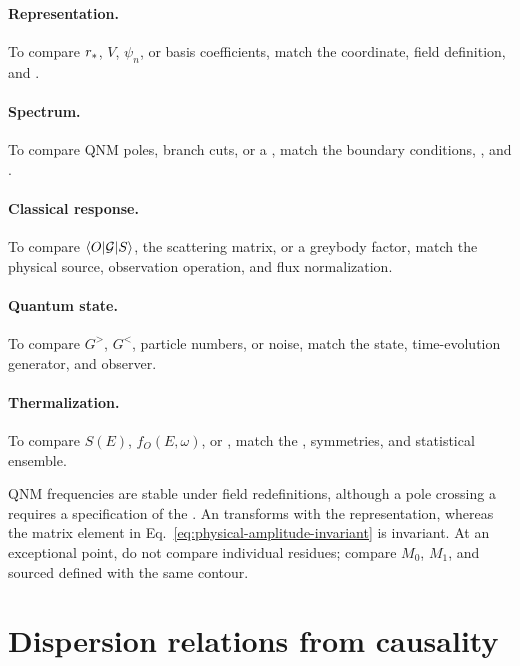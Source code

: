 \paragraph{Representation.}
To compare $r_*$, $V$, $\psi_n$, or basis coefficients, match the coordinate, field definition, and .

\paragraph{Spectrum.}
To compare QNM poles, branch cuts, or a , match the boundary conditions, , and .

\paragraph{Classical response.}
To compare $\langle O \rvert\mathcal{G}\lvert S \rangle$, the scattering matrix, or a greybody factor, match the physical source, observation operation, and flux normalization.

\paragraph{Quantum state.}
To compare $G^>$, $G^<$, particle numbers, or noise, match the state, time-evolution generator, and observer.

\paragraph{Thermalization.}
To compare $S(E)$, $f_O(E,\omega)$, or , match the , symmetries, and statistical ensemble.

QNM frequencies are stable under  field redefinitions, although a pole crossing a  requires a specification of the . An  transforms with the representation, whereas the matrix element in Eq.~\eqref{eq:physical-amplitude-invariant} is invariant. At an exceptional point, do not compare individual residues; compare $M_0$, $M_1$, and sourced  defined with the same contour.

\section{Dispersion relations from causality}

